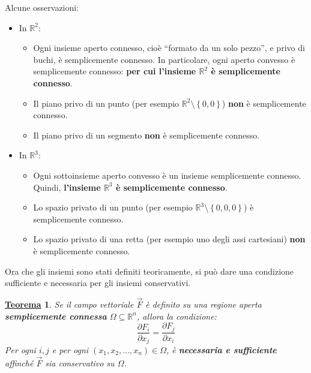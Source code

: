 \documentclass[a4paper]{article}
\newtheorem{theorem}{\textcolor{Red3}{\underline{Teorema}}}
\newcommand{\dquotes}[1]{``#1''}
\newcommand{\definition}[1]{\textcolor{Red3}{\textbf{#1}}}
\begin{document}
	\noindent
	Alcune osservazioni:
	\begin{itemize}
		\item In $\mathbb{R}^{2}$:
		\begin{itemize}
			\item Ogni insieme aperto connesso, cioè \dquotes{formato da un solo pezzo}, e privo di buchi, è semplicemente connesso. In particolare, ogni aperto convesso è semplicemente connesso: \definition{per cui l'insieme $\mathbb{R}^{2}$ è semplicemente connesso}.
			
			\item Il piano privo di un punto (per esempio $\mathbb{R}^{2} \setminus \left\{0,0\right\}$) \textbf{non} è semplicemente connesso.

			\item Il piano privo di un segmento \textbf{non} è semplicemente connesso.
		\end{itemize}

		\item In $\mathbb{R}^{3}$:
		\begin{itemize}
			\item Ogni sottoinsieme aperto convesso è un insieme semplicemente connesso. Quindi, \definition{l'insieme $\mathbb{R}^{3}$ è semplicemente connesso}.

			\item Lo spazio privato di un punto (per esempio $\mathbb{R}^{3} \setminus \left\{0,0,0\right\}$) è semplicemente connesso.

			\item Lo spazio privato di una retta (per esempio uno degli assi cartesiani) \textbf{non} è semplicemente connesso.
		\end{itemize}
	\end{itemize}

	\noindent
	Ora che gli insiemi sono stati definiti teoricamente, si può dare una condizione sufficiente e necessaria per gli insiemi conservativi.\newpage

	\begin{theorem}
		Se il campo vettoriale $\overset{\rightarrow}{F}$ è definito su una regione aperta \textbf{semplicemente connessa} $\Omega \subseteq \mathbb{R}^{n}$, allora la condizione:
		\begin{equation}
			\dfrac{\partial F_{i}}{\partial x_{j}} = \dfrac{\partial F_{j}}{\partial x_{i}}
		\end{equation}
		Per ogni $i,j$ e per ogni $\left(x_{1}, x_{2}, \dots, x_{n}\right) \in \Omega$, è \definition{necessaria e sufficiente} affinché $\overset{\rightarrow}{F}$ sia conservativo su $\Omega$.
	\end{theorem}
\end{document}
